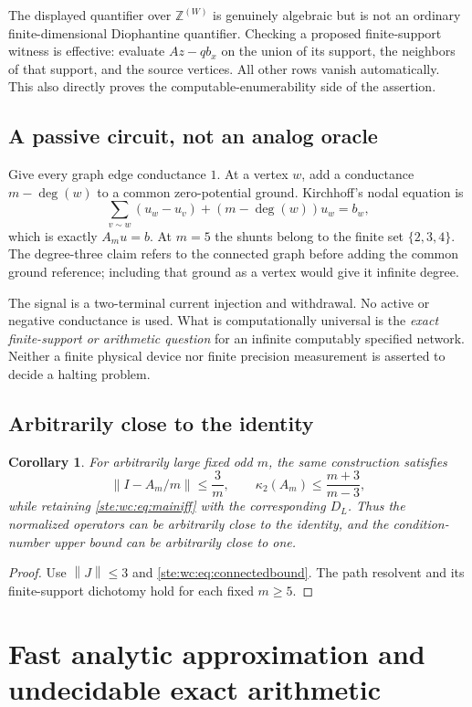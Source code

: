 \documentclass[11pt,letterpaper]{article}
\newtheorem{corollary}[theorem]{Corollary}
\theoremstyle{definition}
\theoremstyle{remark}
\newcommand{\Z}{\mathbb Z}
\newcommand{\norm}[1]{\left\lVert #1\right\rVert}
\begin{document}
The displayed quantifier over $\Z^{(W)}$ is genuinely algebraic but is not
an ordinary finite-dimensional Diophantine quantifier. Checking a proposed
finite-support witness is effective: evaluate $Az-qb_x$ on the union of
its support, the neighbors of that support, and the source vertices. All
other rows vanish automatically. This also directly proves the
computable-enumerability side of the assertion.

\subsection{A passive circuit, not an analog oracle}
Give every graph edge conductance $1$. At a vertex $w$, add a conductance
$m-\deg(w)$ to a common zero-potential ground. Kirchhoff's nodal equation is
\[
 \sum_{v\sim w}(u_w-u_v)+(m-\deg(w))u_w=b_w,
\]
which is exactly $A_mu=b$. At $m=5$ the shunts belong to the finite set
$\{2,3,4\}$. The degree-three claim refers to the connected graph before
adding the common ground reference; including that ground as a vertex
would give it infinite degree.

The signal is a two-terminal current injection and withdrawal. No active
or negative conductance is used. What is computationally universal is the
\emph{exact finite-support or arithmetic question} for an infinite
computably specified network. Neither a finite physical device nor finite
precision measurement is asserted to decide a halting problem.

\subsection{Arbitrarily close to the identity}
\begin{corollary}\label{ste:wc:cor:nearidentity}
For arbitrarily large fixed odd $m$, the same construction satisfies
\[
 \norm{I-A_m/m}\leq\frac3m,
 \qquad \kappa_2(A_m)\leq\frac{m+3}{m-3},
\]
while retaining \eqref{ste:wc:eq:mainiff} with the corresponding $D_L$.
Thus the normalized operators can be arbitrarily close to the identity,
and the condition-number upper bound can be arbitrarily close to one.
\end{corollary}
\begin{proof}
Use $\norm J\leq3$ and \eqref{ste:wc:eq:connectedbound}. The path resolvent and its
finite-support dichotomy hold for each fixed $m\geq5$.
\end{proof}

\section{Fast analytic approximation and undecidable exact arithmetic}
\label{ste:wc:sec:analysis}
\end{document}
